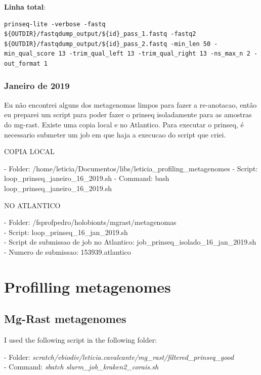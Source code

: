 \documentclass[12pt, a4paper]{report}
\begin{document}
\textbf{Linha total}:
\begin{lstlisting}[breaklines]
prinseq-lite -verbose -fastq ${OUTDIR}/fastqdump_output/${id}_pass_1.fastq -fastq2 ${OUTDIR}/fastqdump_output/${id}_pass_2.fastq -min_len 50 -min_qual_score 13 -trim_qual_left 13 -trim_qual_right 13 -ns_max_n 2 -out_format 1

\end{lstlisting}

\subsection{Janeiro de 2019}
Eu não encontrei alguns dos metagenomas limpos para fazer a re-anotacao, então eu preparei um script para poder fazer o prinseq isoladamente para as amostras do mg-rast. Existe uma copia local e no Atlantico. Para executar o prinseq, é necessario submeter um job em que haja a execucao do script que criei. 

COPIA LOCAL
\begin{tcolorbox}[width=6.3in]
	- Folder: /home/leticia/Documentos/libs/leticia\_profiling\_metagenomes
	- Script: loop\_prinseq\_janeiro\_16\_2019.sh
	- Command: bash loop\_prinseq\_janeiro\_16\_2019.sh
\end{tcolorbox}

NO ATLANTICO
\begin{tcolorbox}[width=6.3in]
	- Folder: /fsprofpedro/holobionts/mgrast/metagenomas\\
	- Script: loop\_prinseq\_16\_jan\_2019.sh\\
	- Script de submissao de job no Atlantico: job\_prinseq\_isolado\_16\_jan\_2019.sh\\
	- Numero de submissao: 153939.atlantico
\end{tcolorbox}
 

\chapter{Profilling metagenomes}
\section{Mg-Rast metagenomes}
I used the following script in the following folder:

\begin{tcolorbox}[width=6.3in]
- Folder: \textit{scratch/ebiodiv/leticia.cavalcante/mg\_rast/filtered\_prinseq\_good}\\
- Command: \textit{sbatch slurm\_job\_kraken2\_corais.sh}
\end{tcolorbox}
\end{document}
